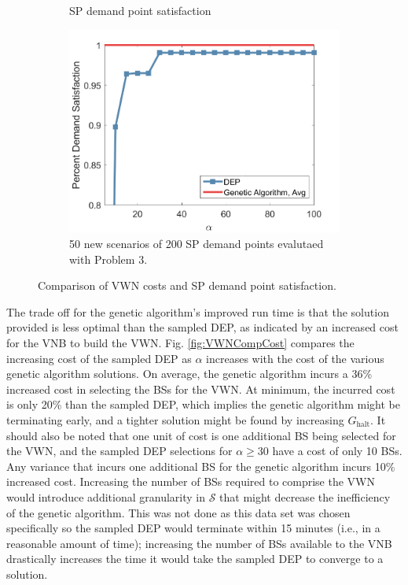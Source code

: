 \documentclass[conference]{IEEEtran}
\begin{document}
\begin{figure}[t]
\begin{subfigure}{.3\textwidth}
	\caption{SP demand point satisfaction}
	\label{fig:VWNCompSatis}
\end{subfigure}
\hspace{0.3cm}
\begin{subfigure}{.3\textwidth}
	\centering
	\includegraphics[width=1\linewidth]{Figures/ComparisonSatisfactionEval}
	\caption{50 new scenarios of 200 SP demand points evalutaed with Problem 3.}
	\label{fig:VWNCompSatisEval}
\end{subfigure}
\caption{\small Comparison of VWN costs and SP demand point satisfaction.}
\label{fig:VWNComp}
\end{figure}

The trade off for the genetic algorithm's improved run time is that the solution provided is less optimal than the sampled DEP, as indicated by an increased cost for the VNB to build the VWN.  Fig. \ref{fig:VWNCompCost} compares the increasing cost of the sampled DEP as $\alpha$ increases with the cost of the various genetic algorithm solutions.  On average, the genetic algorithm incurs a 36\% increased cost in selecting the BSs for the VWN.  At minimum, the incurred cost is only 20\% than the sampled DEP, which implies the genetic algorithm might be terminating early, and a tighter solution might be found by increasing $G_\text{halt}$.  It should also be noted that one unit of cost is one additional BS being selected for the VWN, and the sampled DEP selections for $\alpha \geq 30$ have a cost of only 10 BSs.  Any variance that incurs one additional BS for the genetic algorithm incurs 10\% increased cost.  Increasing the number of BSs required to comprise the VWN would introduce additional granularity in $\mathcal{S}$ that might decrease the inefficiency of the genetic algorithm.  This was not done as this data set was chosen specifically so the sampled DEP would terminate within 15 minutes (i.e., in a reasonable amount of time); increasing the number of BSs available to the VNB drastically increases the time it would take the sampled DEP to converge to a solution.
\end{document}

